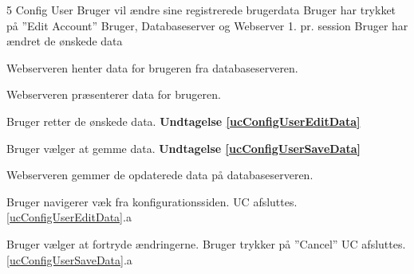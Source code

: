 \uchead
	{5} %
	{Config User} %
	{Bruger vil ændre sine registrerede brugerdata} %
	{Bruger har trykket på ''Edit Account''} %
	{Bruger, Databaseserver og Webserver} %
	{} %
	{1. pr. session} %
	{Bruger har ændret de ønskede data} %


\item\label{ucConfigUserPresentData} Webserveren henter data for brugeren fra databaseserveren.

\item Webserveren præsenterer data for brugeren.

\item\label{ucConfigUserEditData} Bruger retter de ønskede data. \textbf{Undtagelse \ref{ucConfigUserEditData}}

\item\label{ucConfigUserSaveData} Bruger vælger at gemme data. \textbf{Undtagelse \ref{ucConfigUserSaveData}}

\item Webserveren gemmer de opdaterede data på databaseserveren.



\ucdescriptionend %

\ucextension
	{Bruger navigerer væk fra konfigurationssiden.}
	{UC afsluttes.}
	{\ref{ucConfigUserEditData}.a}

\ucextension
	{Bruger vælger at fortryde ændringerne.}
	{Bruger trykker på ''Cancel'' \newline
	UC afsluttes.}
	{\ref{ucConfigUserSaveData}.a}

